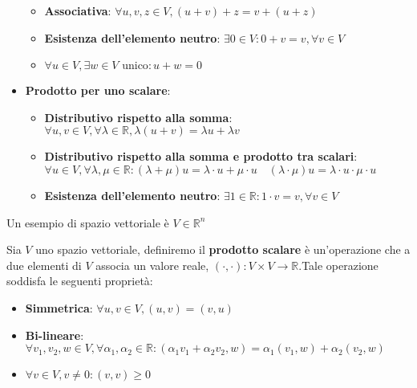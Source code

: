 \begin{itemize}
\begin{itemize}
              \item \textbf{Associativa}: $\forall u,v,z \in V, (u+v)+z = v+(u+z)$
              \item \textbf{Esistenza dell'elemento neutro}: $\exists 0 \in V: 0+v = v,
                        \forall v\in V$
              \item $\forall u \in V, \exists w\in V \text{ unico}: u+w=0$
          \end{itemize}
    \item \textbf{Prodotto per uno scalare}:
          \begin{itemize}
              \item \textbf{Distributivo rispetto alla somma}: $\forall u,v \in
                        V, \forall \lambda \in \mathbb{R}, \lambda(u+v) = \lambda
                        u+\lambda v$
              \item \textbf{Distributivo rispetto alla somma e prodotto tra scalari}:
                    $\forall u \in V, \forall \lambda,\mu\in \mathbb{R}: (\lambda +
                        \mu)u = \lambda \cdot u + \mu \cdot u \quad (\lambda \cdot
                        \mu)u = \lambda \cdot u \cdot \mu \cdot u$
              \item \textbf{Esistenza dell'elemento neutro}: $\exists 1 \in
                        \mathbb{R}:1\cdot v = v, \forall v\in V$
          \end{itemize}
\end{itemize}
\begin{esempio}
    Un esempio di spazio vettoriale è $V\in \mathbb{R}^n$
\end{esempio}
\begin{definizione} 
    Sia $V$ uno spazio vettoriale, definiremo il \textbf{prodotto scalare} è un'operazione
    che a due elementi di $V$ associa un valore reale, $(\cdot, \cdot):V\times V
        \rightarrow \mathbb{R}$.Tale operazione soddisfa le seguenti proprietà:
    \begin{itemize}
        \item \textbf{Simmetrica}: $\forall u,v \in V, (u,v) = (v,u)$
        \item \textbf{Bi-lineare}: $\forall v_1,v_2,w \in V,\forall\alpha_1,
                  \alpha_2 \in \mathbb{R}:(\alpha_1v_1+\alpha_2v_2, w) =
                  \alpha_1(v_1, w) + \alpha_2(v_2, w)$
        \item $\forall v \in V, v\ne 0: (v,v) \ge 0$
    \end{itemize}
\end{definizione}
